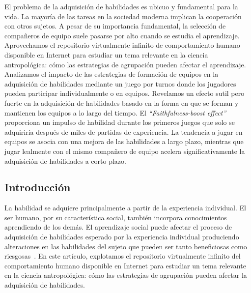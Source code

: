 \documentclass[a4paper,10pt]{book}
\theoremstyle{definition}
\begin{document}
El problema de la adquisición de habilidades es ubicuo y fundamental para la vida.
%
La mayoría de las tareas en la sociedad moderna implican la cooperación con otros sujetos.
%
A pesar de su importancia fundamental, la selección de compañeros de equipo suele pasarse por alto cuando se estudia el aprendizaje.
%
Aprovechamos el repositorio virtualmente infinito de comportamiento humano disponible en Internet para estudiar un tema relevante en la ciencia antropológica: cómo las estrategias de agrupación pueden afectar el aprendizaje.
%
Analizamos el impacto de las estrategias de formación de equipos en la adquisición de habilidades mediante un juego por turnos donde los jugadores pueden participar individualmente o en equipos.
%
Revelamos un efecto sutil pero fuerte en la adquisición de habilidades basado en la forma en que se forman y mantienen los equipos a lo largo del tiempo.
%
El \emph{``Faithfulness-boost effect''} proporciona un impulso de habilidad durante los primeros juegos que solo se adquiriría después de miles de partidas de experiencia.
%
La tendencia a jugar en equipos se asocia con una mejora de las habilidades a largo plazo, mientras que jugar lealmente con el mismo compañero de equipo acelera significativamente la adquisición de habilidades a corto plazo.

\subsection{Introducción}

La habilidad se adquiere principalmente a partir de la experiencia individual.
%
El ser humano, por su característica social, también incorpora conocimientos aprendiendo de los demás.
%
El aprendizaje social puede afectar el proceso de adquisición de habilidades esperado por la experiencia individual produciendo alteraciones en las habilidades del sujeto que pueden ser tanto beneficiosas como riesgosas~\cite{Boyd2011}.
%
En este artículo, explotamos el repositorio virtualmente infinito del comportamiento humano disponible en Internet para estudiar un tema relevante en la ciencia antropológica: cómo las estrategias de agrupación pueden afectar la adquisición de habilidades.

\end{document}
